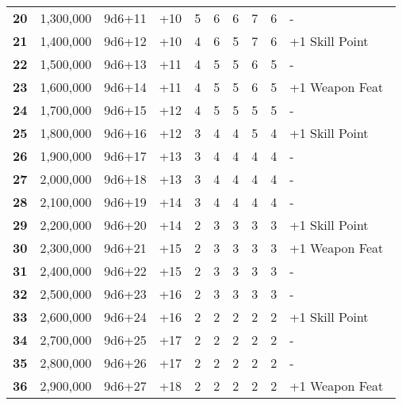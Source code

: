 \begin {table}[H]
\begin{tabularx}{\columnwidth}{>{\bfseries}cccM{.31in}M{.51in}M{.25in}M{.43in}M{.32in}M{.45in}Y}
		20 & 1,300,000 & 9d6+11 & +10 & 5 & 6 & 6 & 7 & 6 & -\\
		21 & 1,400,000 & 9d6+12 & +10 & 4 & 6 & 5 & 7 & 6 & +1 Skill Point\\
		22 & 1,500,000 & 9d6+13 & +11 & 4 & 5 & 5 & 6 & 5 & -\\
		23 & 1,600,000 & 9d6+14 & +11 & 4 & 5 & 5 & 6 & 5 & +1 Weapon Feat\\
		24 & 1,700,000 & 9d6+15 & +12 & 4 & 5 & 5 & 5 & 5 & -\\
		25 & 1,800,000 & 9d6+16 & +12 & 3 & 4 & 4 & 5 & 4 & +1 Skill Point\\
		26 & 1,900,000 & 9d6+17 & +13 & 3 & 4 & 4 & 4 & 4 & -\\
		27 & 2,000,000 & 9d6+18 & +13 & 3 & 4 & 4 & 4 & 4 & -\\
		28 & 2,100,000 & 9d6+19 & +14 & 3 & 4 & 4 & 4 & 4 & -\\
		29 & 2,200,000 & 9d6+20 & +14 & 2 & 3 & 3 & 3 & 3 & +1 Skill Point\\
		30 & 2,300,000 & 9d6+21 & +15 & 2 & 3 & 3 & 3 & 3 & +1 Weapon Feat\\
		31 & 2,400,000 & 9d6+22 & +15 & 2 & 3 & 3 & 3 & 3 & -\\
		32 & 2,500,000 & 9d6+23 & +16 & 2 & 3 & 3 & 3 & 3 & -\\
		33 & 2,600,000 & 9d6+24 & +16 & 2 & 2 & 2 & 2 & 2 & +1 Skill Point\\
		34 & 2,700,000 & 9d6+25 & +17 & 2 & 2 & 2 & 2 & 2 & -\\
		35 & 2,800,000 & 9d6+26 & +17 & 2 & 2 & 2 & 2 & 2 & -\\
		36 & 2,900,000 & 9d6+27 & +18 & 2 & 2 & 2 & 2 & 2 & +1 Weapon Feat\
  \end {tabularx}
\end {table}
\newpage
